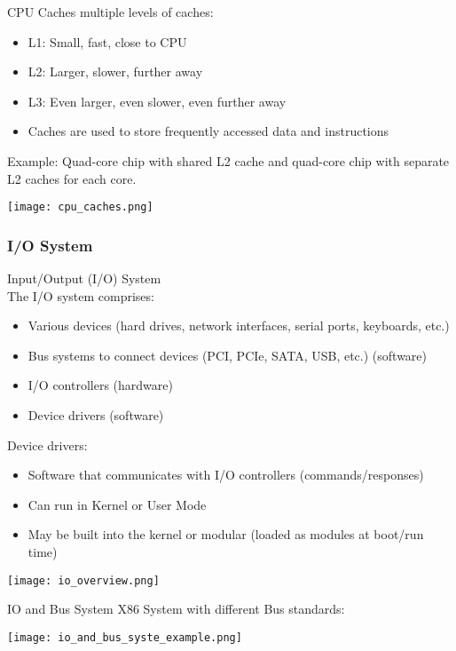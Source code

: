 \begin{theorem}{CPU Caches} multiple levels of caches:

    \begin{minipage}{0.6\linewidth}
    \begin{itemize}
        \item L1: Small, fast, close to CPU
        \item L2: Larger, slower, further away
        \item L3: Even larger, even slower, even further away
        \item Caches are used to store frequently accessed data and instructions
    \end{itemize}    
    Example: Quad-core chip with shared L2 cache and quad-core chip with separate L2 caches for each core.
    \end{minipage}
    \begin{minipage}{0.39\linewidth}
    \texttt{[image: cpu\_caches.png]}    
    \end{minipage}
\end{theorem}

\columnbreak

\subsubsection{I/O System}


\begin{definition}{Input/Output (I/O) System}\\
    The I/O system comprises:
    \begin{itemize}
        \item Various devices (hard drives, network interfaces, serial ports, keyboards, etc.)
        \item Bus systems to connect devices (PCI, PCIe, SATA, USB, etc.) (software)
        \item I/O controllers (hardware)
        \item Device drivers (software)
    \end{itemize}
    Device drivers:
    \begin{itemize}
        \item Software that communicates with I/O controllers (commands/responses)
        \item Can run in Kernel or User Mode
        \item May be built into the kernel or modular (loaded as modules at boot/run time)
    \end{itemize}
    \texttt{[image: io\_overview.png]}
\end{definition}

\begin{example2}{IO and Bus System} X86 System with different Bus standards:

    \texttt{[image: io\_and\_bus\_syste\_example.png]}
\end{example2}

\multend





